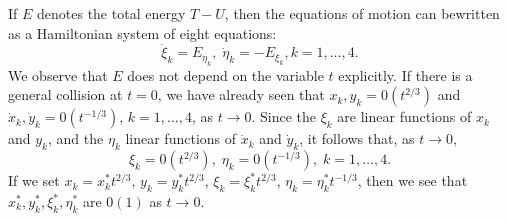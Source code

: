 If $E$ denotes the total energy $T - U$, then the equations of motion
can be\pageoriginale written as a Hamiltonian system of eight
equations: 
\begin{equation*}
\dot{\xi}_k = E_{\eta_k}, \; \dot{\eta}_{k} = - E_{\xi_k}, k = 1,
\ldots, 4. \tag{3.4.5}\label{chap3:eq3.4.5} 
\end{equation*}
We observe that $E$ does not depend on the variable $t$ explicitly. If
there is a general collision at $t = 0$, we have already seen that
$x_k, y_k = 0(t^{2/3})$ and $\dot{x}_k , \dot{y}_k = 0 (t^{-1/3})$, $k
= 1, \ldots, 4$, as $t \to 0$. Since the $\xi_k$ are linear functions
of $x_k$ and $y_k$, and the $\eta_k$ linear functions of $\dot{x}_k$
and $\dot{y}_k$, it follows that, as $t \to 0 $,  
\begin{equation*}
\xi_k = 0 (t^{2/3}), \; \eta_k = 0 (t^{-1/3}), \; k = 1, \ldots,
4. \tag{3.4.6}\label{chap3:eq3.4.6} 
\end{equation*}
If we set $x_k = x^*_kt^{2/3}$, $y_k = y^*_k t^{2/3}$, $\xi_k =
\xi^*_k t^{2/3}$, $\eta_k = \eta^*_k t^{-1/3}$, then we see that
$x^*_k, y^*_k, \xi^*_k, \eta^*_k$ are $0(1)$ as $t \to 0$. 

